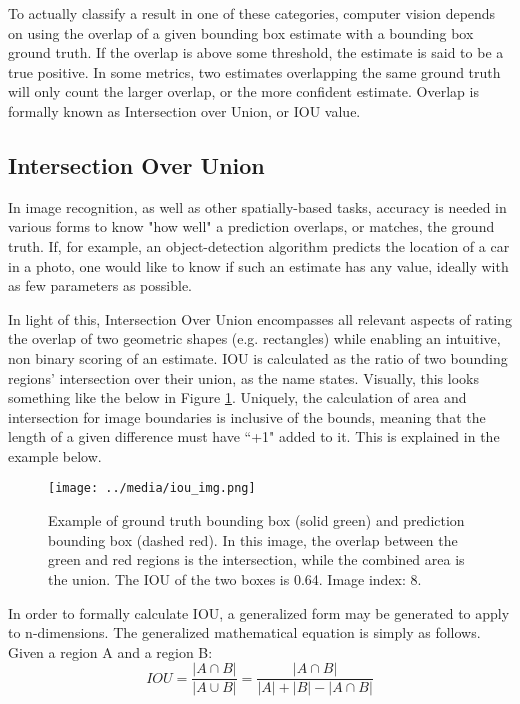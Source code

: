 To actually classify a result in one of these categories, computer vision depends on using the overlap of a given bounding box estimate with a bounding box ground truth. If the overlap is above some threshold, the estimate is said to be a true positive. In some metrics, two estimates overlapping the same ground truth will only count the larger overlap, or the more confident estimate. Overlap is formally known as Intersection over Union, or IOU value.

\subsection{Intersection Over Union}
In image recognition, as well as other spatially-based tasks, accuracy is needed in various forms to know "how well" a prediction overlaps, or matches, the ground truth. If, for example, an object-detection algorithm predicts the location of a car in a photo, one would like to know if such an estimate has any value, ideally with as few parameters as possible.

In light of this, Intersection Over Union encompasses all relevant aspects of rating the overlap of two geometric shapes (e.g. rectangles) while enabling an intuitive, non binary scoring of an estimate. IOU is calculated as the ratio of two bounding regions' intersection over their union, as the name states. Visually, this looks something like the below in Figure \ref{iou_img}. Uniquely, the calculation of area and intersection for image boundaries is inclusive of the bounds, meaning that the length of a given difference must have ``+1" added to it. This is explained in the example below.

\begin{figure}[ht] %
    \texttt{[image: ../media/iou\_img.png]}
    \caption{Example of ground truth bounding box (solid green) and prediction bounding box (dashed red). In this image, the overlap between the green and red regions is the intersection, while the combined area is the union. The IOU of the two boxes is 0.64. Image index: 8.}
    \label{iou_img} %
\end{figure}

In order to formally calculate IOU, a generalized form may be generated to apply to n-dimensions. The generalized mathematical equation is simply as follows. Given a region A and a region B: 
\begin{equation}
IOU = \frac{|A\cap B|}{|A\cup B|} = \frac{|A\cap B|}{|A|+|B|- |A\cap B|}
\end{equation}


